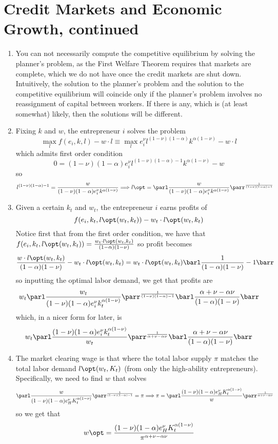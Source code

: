 \documentclass[10pt]{article}
\begin{document}
\maketitle

\section*{Credit Markets and Economic Growth, continued}


\begin{enumerate}
	\item You can not necessarily compute the competitive equilibrium by solving the planner's problem, as the First Welfare Theorem requires that markets are complete, which we do not have once the credit markets are shut down. Intuitively, the solution to the planner's problem and the solution to the competitive equilibrium will coincide only if the planner's problem involves no reassignment of capital between workers. If there is any, which is (at least somewhat) likely, then the solutions will be different.
	\item Fixing $k$ and $w$, the entrepreneur $i$ solves the problem\[\max_l f(e_i,k,l) - w\cdot l \equiv \max_l e_i^\nu l^{(1-\nu)(1-\alpha)} k^{\alpha(1-\nu)} - w \cdot l\]which admits first order condition\[0 = (1-\nu)(1-\alpha)e_i^\nu l^{(1-\nu)(1-\alpha) - 1} k^{\alpha(1-\nu)} - w\]so \[ l^{(1-\nu)(1-\alpha) - 1} = \frac{w}{(1-\nu)(1-\alpha)e_i^\nu k^{\alpha(1-\nu)}} \Longrightarrow  l\opt = \parl \frac{w}{(1-\nu)(1-\alpha)e_i^\nu k^{\alpha(1-\nu)}}\parr^{\frac{1}{(1-\nu)(1-\alpha)-1}}\]
	\item Given a certain $k_t$ and $w_t$, the entrepreneur $i$ earns profits of \[f(e_i,k_t,l\opt(w_t,k_t)) - w_t \cdot l\opt(w_t,k_t)\]Notice first that from the first order condition, we have that $f(e_i,k_t,l\opt(w_t,k_t)) = \frac{w_t\cdot l\opt(w_t,k_t)}{(1-\alpha)(1-\nu)}$ so profit becomes\[\frac{w\cdot l\opt(w_t,k_t)}{(1-\alpha)(1-\nu)} - w_t\cdot l\opt(w_t,k_t) = w_t\cdot l\opt(w_t,k_t)\barl \frac{1}{(1-\alpha)(1-\nu)}-1\barr\]so inputting the optimal labor demand, we get that profits are\[w_t  \parl \frac{w_t}{(1-\nu)(1-\alpha)e_i^\nu k_t^{\alpha(1-\nu)}}\parr^{\frac{1}{(1-\nu)(1-\alpha)-1}}\barl \frac{\alpha + \nu - \alpha\nu}{(1-\alpha)(1-\nu)}\barr\]which, in a nicer form for later, is \[w_t \parl \frac{(1-\nu)(1-\alpha)e_i^\nu k_t^{\alpha(1-\nu)}}{w_t}\parr^{\frac{1}{\alpha+\nu-\alpha\nu}} \barl \frac{\alpha + \nu - \alpha\nu}{(1-\alpha)(1-\nu)}\barr\]
	\item The market clearing wage is that where the total labor supply $\pi$ matches the total labor demand $l\opt(w_t,K_t)$ (from only the high-ability entrepreneurs). Specifically, we need to find $w$ that solves\[\parl \frac{w}{(1-\nu)(1-\alpha)e_H^\nu K_t^{\alpha(1-\nu)}}\parr^{\frac{1}{(1-\nu)(1-\alpha)-1}} = \pi\Longrightarrow \pi = \parl \frac{(1-\nu)(1-\alpha)e_H^\nu K_t^{\alpha(1-\nu)}}{w}\parr^{\frac{1}{\alpha + \nu - \alpha \nu}}\]so we get that\[w\opt = \frac{(1-\nu)(1-\alpha)e_H^\nu K_t^{\alpha(1-\nu)}}{\pi^{\alpha+\nu-\alpha\nu}}\]

\end{enumerate}
\end{document}
